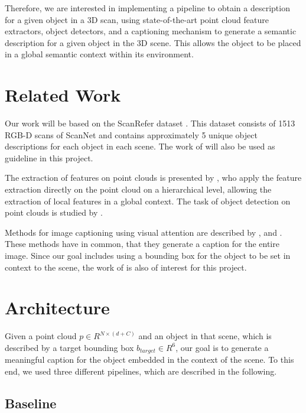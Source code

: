 \documentclass[10pt,twocolumn,letterpaper]{article}
\begin{document}
Therefore, we are interested in implementing a pipeline to obtain a description for a given object in a 3D scan, using state-of-the-art point cloud feature extractors, object detectors, and a captioning mechanism to generate a semantic description for a given object in the 3D scene. This allows the object to be placed in a global semantic context within its environment.
 
\section{Related Work}
Our work will be based on the ScanRefer dataset \cite{chen2019scanrefer}. This dataset consists of 1513 RGB-D scans of ScanNet \cite{dai2017scannet} and contains approximately 5 unique object descriptions for each object in each scene. The work of \cite{chen2019scanrefer} will also be used as guideline in this project.

The extraction of features on point clouds is presented by \cite{qi2017pointnet++}, who apply the feature extraction directly on the point cloud on a hierarchical level, allowing the extraction of local features in a global context. 
The task of object detection on point clouds is studied by \cite{qi2019deep}. 

Methods for image captioning using visual attention are described by \cite{xu2015show}, \cite{lu2017knowing} and \cite{anderson2018bottom}.
These methods have in common, that they generate a caption for the entire image.
Since our goal includes using a bounding box for the object to be set in context to the scene, the work of \cite{rohrbach2016grounding} is also of interest for this project. 

\section{Architecture}

Given a point cloud $\mathit{p \in R^{N\times(d+C)}}$ and an object in that scene, which is described by a target bounding box $b_{target}\in R^6$, our goal is to generate a meaningful caption for the object embedded in the context of the scene. To this end, we used three different pipelines, which are described in the following.

\subsection{Baseline}
\end{document}
